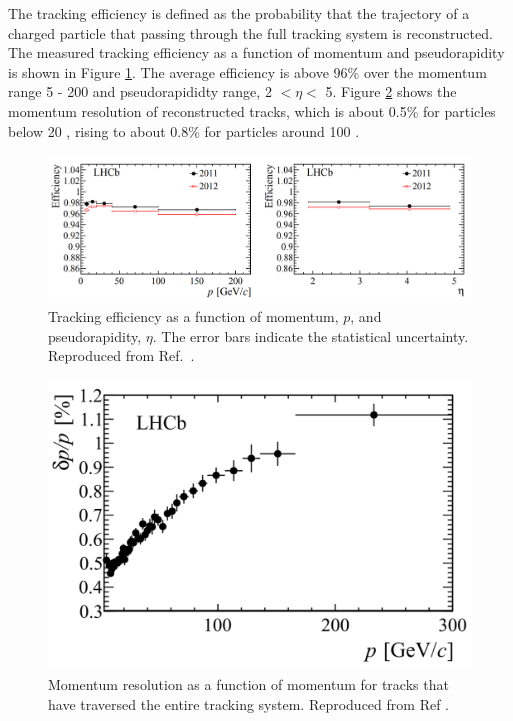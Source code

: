 The tracking efficiency is defined as the probability that the trajectory of a charged particle that passing through the full tracking system is reconstructed. The measured tracking efficiency as a function of momentum and pseudorapidity is shown in Figure \ref{trackingeff}. The average efficiency is above 96\% over the momentum range 5 - 200 \gevc and pseudorapididty range, 2 $< \eta <$ 5. Figure \ref{momentumres} shows the momentum resolution of reconstructed tracks, which is about 0.5\% for particles below 20 \gevc, rising to about 0.8\% for particles around 100 \gevc. 

\begin{figure}
\includegraphics[width=\linewidth]{figures/detector/trackingefficiency.pdf}
\caption{Tracking efficiency as a function of momentum, $p$, and pseudorapidity, $\eta$. The error bars indicate the statistical uncertainty. Reproduced from Ref.~\cite{LHCb-DP-2013-002}.}
\label{trackingeff}
\end{figure}

\begin{figure}
\centering
\includegraphics[width=0.5\linewidth]{figures/detector/momentumresolution.pdf}
\caption{Momentum resolution as a function of momentum for tracks that have traversed the entire tracking system. Reproduced from Ref \cite{LHCb-DP-2014-002}.}
\label{momentumres}
\end{figure}
	
